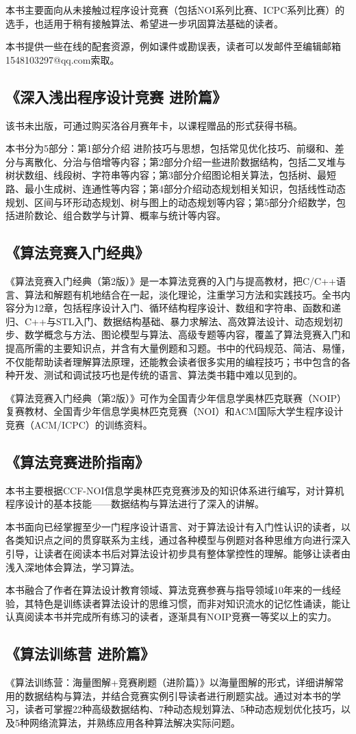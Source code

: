 本书主要面向从未接触过程序设计竞赛（包括NOI系列比赛、ICPC系列比赛）的选手，也适用于稍有接触算法、希望进一步巩固算法基础的读者。

本书提供一些在线的配套资源，例如课件或勘误表，读者可以发邮件至编辑邮箱1548103297@qq.com索取。
\subsection*{《深入浅出程序设计竞赛 进阶篇》\md{[汪楚奇]}}
该书未出版，可通过购买洛谷月赛年卡，以课程赠品的形式获得书稿。

本书分为5部分：第1部分介绍 进阶技巧与思想，包括常见优化技巧、前缀和、差分与离散化、分治与倍增等内容；第2部分介绍一些进阶数据结构，包括二叉堆与树状数组、线段树、字符串等内容；第3部分介绍图论相关算法，包括树、最短路、最小生成树、连通性等内容；第4部分介绍动态规划相关知识，包括线性动态规划、区间与环形动态规划、树与图上的动态规划等内容；第5部分介绍数学，包括进阶数论、组合数学与计算、概率与统计等内容。

\subsection*{《算法竞赛入门经典》 \md{[刘汝佳]}}
《算法竞赛入门经典（第2版）》是一本算法竞赛的入门与提高教材，把C/C++语言、算法和解题有机地结合在一起，淡化理论，注重学习方法和实践技巧。全书内容分为12章，包括程序设计入门、循环结构程序设计、数组和字符串、函数和递归、C++与STL入门、数据结构基础、暴力求解法、高效算法设计、动态规划初步、数学概念与方法、图论模型与算法、高级专题等内容，覆盖了算法竞赛入门和提高所需的主要知识点，并含有大量例题和习题。书中的代码规范、简洁、易懂，不仅能帮助读者理解算法原理，还能教会读者很多实用的编程技巧；书中包含的各种开发、测试和调试技巧也是传统的语言、算法类书籍中难以见到的。

《算法竞赛入门经典（第2版）》可作为全国青少年信息学奥林匹克联赛（NOIP）复赛教材、全国青少年信息学奥林匹克竞赛（NOI）和ACM国际大学生程序设计竞赛（ACM/ICPC）的训练资料。
\subsection*{《算法竞赛进阶指南》 \md{[李煜东]}}


本书主要根据CCF-NOI信息学奥林匹克竞赛涉及的知识体系进行编写，对计算机程序设计的基本技能——数据结构与算法进行了深入的讲解。

本书面向已经掌握至少一门程序设计语言、对于算法设计有入门性认识的读者，以各类知识点之间的贯穿联系为主线，通过各种模型与例题对各种思维方向进行深入引导，让读者在阅读本书后对算法设计初步具有整体掌控性的理解。能够让读者由浅入深地体会算法，学习算法。

本书融合了作者在算法设计教育领域、算法竞赛参赛与指导领域10年来的一线经验，其特色是训练读者算法设计的思维习惯，而非对知识流水的记忆性诵读，能让认真阅读本书并完成所有练习的读者，逐渐具有NOIP竞赛一等奖以上的实力。

\subsection*{《算法训练营 进阶篇》\md{[陈小玉]}}
《算法训练营：海量图解+竞赛刷题（进阶篇）》以海量图解的形式，详细讲解常用的数据结构与算法，并结合竞赛实例引导读者进行刷题实战。通过对本书的学习，读者可掌握22种高级数据结构、7种动态规划算法、5种动态规划优化技巧，以及5种网络流算法，并熟练应用各种算法解决实际问题。
